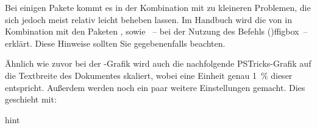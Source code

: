 \documentclass[%
  english,ngerman,%
  cdgeometry=no,DIV=12,%
  cd=false,cdfont=false,cdtitle=true,%
  headings=normal,%
  automark,%
  listof=toc,%
]{tudscrartcl}
\begin{document}
Bei einigen Pakete kommt es in der Kombination mit  zu 
kleineren Problemen, die sich jedoch meist relativ leicht beheben lassen. Im 
Handbuch wird die  
von  in Kombination mit den Paketen , 
 sowie ~-- bei der Nutzung des Befehls 
\Macro(){ffigbox}~-- erklärt. Diese Hinweise sollten Sie 
gegebenenfalls beachten.

Ähnlich wie zuvor bei der -Grafik wird auch die nachfolgende 
PSTricks-Grafik auf die Textbreite des Dokumentes skaliert, wobei eine Einheit 
genau \SI{1}{\percent} dieser entspricht. Außerdem werden noch ein paar weitere 
Einstellungen gemacht. Dies geschieht mit:
%
\begin{Code}[input]{hint}
\end{Code}
\end{document}
